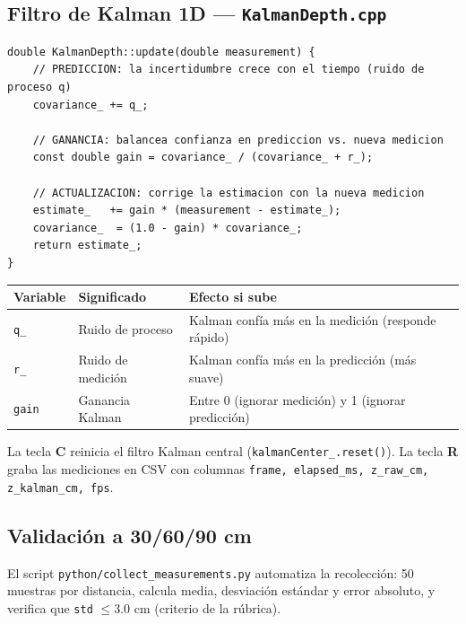 \documentclass[11pt,a4paper]{article}
\begin{document}
\subsection*{Filtro de Kalman 1D — \texttt{KalmanDepth.cpp}}

\begin{lstlisting}[caption={Filtro de Kalman escalar (las 3 ecuaciones clave)}]
double KalmanDepth::update(double measurement) {
    // PREDICCION: la incertidumbre crece con el tiempo (ruido de proceso q)
    covariance_ += q_;

    // GANANCIA: balancea confianza en prediccion vs. nueva medicion
    const double gain = covariance_ / (covariance_ + r_);

    // ACTUALIZACION: corrige la estimacion con la nueva medicion
    estimate_   += gain * (measurement - estimate_);
    covariance_  = (1.0 - gain) * covariance_;
    return estimate_;
}
\end{lstlisting}

\begin{center}
\begin{tabular}{lll}
\toprule
\textbf{Variable} & \textbf{Significado} & \textbf{Efecto si sube} \\
\midrule
\texttt{q\_} & Ruido de proceso & Kalman confía más en la medición (responde rápido) \\
\texttt{r\_} & Ruido de medición & Kalman confía más en la predicción (más suave) \\
\texttt{gain} & Ganancia Kalman & Entre 0 (ignorar medición) y 1 (ignorar predicción) \\
\bottomrule
\end{tabular}
\end{center}

\noindent La tecla \textbf{C} reinicia el filtro Kalman central (\texttt{kalmanCenter\_.reset()}).
La tecla \textbf{R} graba las mediciones en CSV con columnas \texttt{frame, elapsed\_ms, z\_raw\_cm, z\_kalman\_cm, fps}.

\subsection*{Validación a 30/60/90 cm}
El script \texttt{python/collect\_measurements.py} automatiza la recolección:
50 muestras por distancia, calcula media, desviación estándar y error absoluto,
y verifica que \texttt{std} $\leq 3.0$ cm (criterio de la rúbrica).

\end{document}
